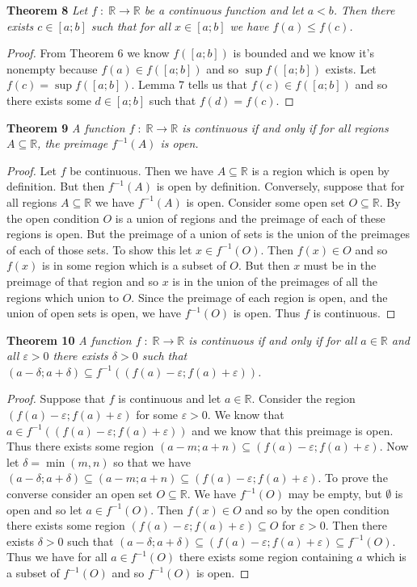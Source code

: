 \documentclass{article}
\begin{document}
\begin{flushleft}
\textbf{Theorem 8}
\textsl{Let $f \; : \; \mathbb{R} \rightarrow \mathbb{R}$ be a continuous function and let $a < b$. Then there exists $c \in [a;b]$ such that for all $x \in [a;b]$ we have $f(a) \leq f(c)$.}
\begin{proof}
From Theorem 6 we know $f([a;b])$ is bounded and we know it's nonempty because $f(a) \in f([a;b])$ and so $\sup f([a;b])$ exists. Let $f(c) = \sup f([a;b])$. Lemma 7 tells us that $f(c) \in f([a;b])$ and so there exists some $d \in [a;b]$ such that $f(d) = f(c)$.
\end{proof}

\textbf{Theorem 9}
\textsl{A function $f \; : \; \mathbb{R} \rightarrow \mathbb{R}$ is continuous if and only if for all regions $A \subseteq \mathbb{R}$, the preimage $f^{-1}(A)$ is open.}
\begin{proof}
Let $f$ be continuous. Then we have $A \subseteq \mathbb{R}$ is a region which is open by definition. But then $f^{-1}(A)$ is open by definition. Conversely, suppose that for all regions $A \subseteq \mathbb{R}$ we have $f^{-1}(A)$ is open. Consider some open set $O \subseteq \mathbb{R}$. By the open condition $O$ is a union of regions and the preimage of each of these regions is open. But the preimage of a union of sets is the union of the preimages of each of those sets. To show this let $x \in f^{-1}(O)$. Then $f(x) \in O$ and so $f(x)$ is in some region which is a subset of $O$. But then $x$ must be in the preimage of that region and so $x$ is in the union of the preimages of all the regions which union to $O$. Since the preimage of each region is open, and the union of open sets is open, we have $f^{-1}(O)$ is open. Thus $f$ is continuous.
\end{proof}

\textbf{Theorem 10}
\textsl{A function $f \; : \; \mathbb{R} \rightarrow \mathbb{R}$ is continuous if and only if for all $a \in \mathbb{R}$ and all $\varepsilon > 0$ there exists $\delta > 0$ such that $(a - \delta ; a + \delta) \subseteq f^{-1}((f(a) - \varepsilon ; f(a) + \varepsilon))$.}
\begin{proof}
Suppose that $f$ is continuous and let $a \in \mathbb{R}$. Consider the region $(f(a) - \varepsilon ; f(a) + \varepsilon)$ for some $\varepsilon > 0$. We know that $a \in f^{-1}((f(a) - \varepsilon ; f(a) + \varepsilon))$ and we know that this preimage is open. Thus there exists some region $(a-m;a+n) \subseteq (f(a) - \varepsilon ; f(a) + \varepsilon)$. Now let $\delta = \min (m,n)$ so that we have $(a - \delta ; a + \delta) \subseteq (a-m;a+n) \subseteq (f(a) - \varepsilon ; f(a) + \varepsilon)$. To prove the converse consider an open set $O \subseteq \mathbb{R}$. We have $f^{-1}(O)$ may be empty, but $\emptyset$ is open and so let $a \in f^{-1}(O)$. Then $f(x) \in O$ and so by the open condition there exists some region $(f(a) - \varepsilon ; f(a) + \varepsilon) \subseteq O$ for $\varepsilon > 0$. Then there exists $\delta > 0$ such that $(a - \delta ; a + \delta) \subseteq (f(a) - \varepsilon ; f(a) + \varepsilon) \subseteq f^{-1} (O)$. Thus we have for all $a \in f^{-1} (O)$ there exists some region containing $a$ which is a subset of $f^{-1} (O)$ and so $f^{-1}(O)$ is open.
\end{proof}


\end{flushleft}
\end{document}
